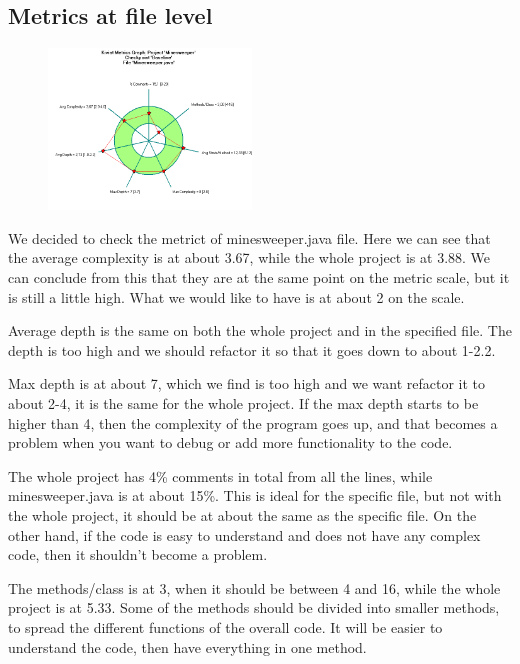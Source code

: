 \documentclass[UKenglish]{article}  %
\begin{document}
\subsection{Metrics at file level}

\begin{figure}
	\vspace{-8ex}
	\begin{center}
		\includegraphics[width=0.48\textwidth]{kiviat_diagram_minesweeper}
	\end{center}
	\vspace{-20ex}
\end{figure}

We decided to check the metrict of minesweeper.java file. Here we can see that
the average complexity is at about 3.67, while the whole project is at 3.88. We
can conclude from this that they are at the same point on the metric scale, but
it is still a little high. What we would like to have is at about 2 on the
scale.

Average depth is the same on both the whole project and in the specified file.
The depth is too high and we should refactor it so that it goes down to about
1-2.2.

Max depth is at about 7, which we find is too high and we want refactor it to
about 2-4, it is the same for the whole project. If the max depth starts to be
higher than 4, then the complexity of the program goes up, and that becomes a
problem when you want to debug or add more functionality to the code.

The whole project has 4\% comments in total from all the lines, while
minesweeper.java is at about 15\%. This is ideal for the specific file, but not
with the whole project, it should be at about the same as the specific file. On
the other hand, if the code is easy to understand and does not have any complex
code, then it shouldn't become a problem.

The methods/class is at 3, when it should be between 4 and 16, while the whole
project is at 5.33. Some of the methods should be divided into smaller methods,
to spread the different functions of the overall code. It will be easier to
understand the code, then have everything in one method.
\end{document}
